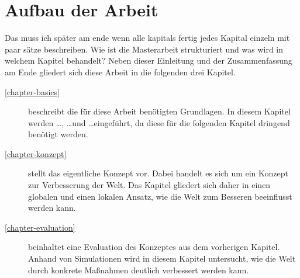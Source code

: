 \section{Aufbau der Arbeit}
Das muss ich später am ende wenn alle kapitals fertig jedes Kapital einzeln mit paar sätze beschreiben.
Wie ist die Masterarbeit strukturiert und was wird in welchem Kapitel behandelt?
Neben dieser Einleitung und der Zusammenfassung am Ende gliedert sich diese Arbeit in die folgenden drei Kapitel.
\begin{description}
  \item[\ref{chapter-basics}] beschreibt die für diese Arbeit benötigten Grundlagen. In diesem Kapitel werden \ldots, \ldots und \ldots eingeführt, da diese für die folgenden Kapitel dringend benötigt werden.
  \item[\ref{chapter-konzept}] stellt das eigentliche Konzept vor. Dabei handelt es sich um ein Konzept zur Verbesserung der Welt. Das Kapitel gliedert sich daher in einen globalen und einen lokalen Ansatz, wie die Welt zum Besseren beeinflusst werden kann.
  \item[\ref{chapter-evaluation}] beinhaltet eine Evaluation des Konzeptes aus dem vorherigen Kapitel. Anhand von Simulationen wird in diesem Kapitel untersucht, wie die Welt durch konkrete Maßnahmen deutlich verbessert werden kann.
\end{description}

